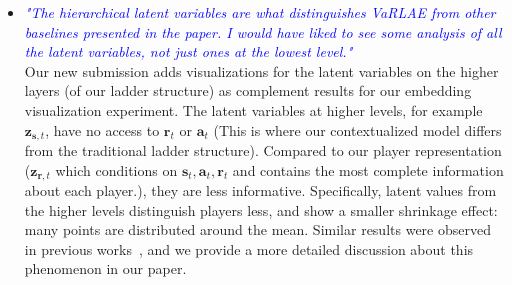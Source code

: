 \documentclass[letterpaper]{article} %
\newcommand{\latentvariables}{\mathbf{z}}
\newcommand{\state}{\mathbf{s}}
\newcommand{\action}{\mathbf{a}}
\newcommand{\reward}{\boldsymbol{r}}
\begin{document}
\begin{itemize}
    \item \textcolor{Blue}{\it "The hierarchical latent variables are what distinguishes VaRLAE from other baselines presented in the paper. I would have liked to see some analysis of all the latent variables, not just ones at the lowest level."}\\
    Our new submission adds visualizations for the latent variables on the higher layers (of our ladder structure) as complement results for our embedding visualization experiment.
    The latent variables at higher levels, for example $\latentvariables_{\state,t}$, have no access to $\reward_{t}$ or $\action_{t}$ (This is where our contextualized model differs from the traditional ladder structure). Compared to our player representation ($\latentvariables_{\reward,t}$ which conditions on $\state_{t},\action_{t},\reward_{t}$ and contains the most complete information about each player.), they are less informative. Specifically, latent values from the higher levels distinguish players less, and show a smaller shrinkage effect:  many points are distributed around the mean. Similar results were observed in previous works~\cite{SonderbyLadderVAE16}, and we provide a more detailed discussion about this phenomenon in our paper.
    

\end{itemize}
\end{document}
